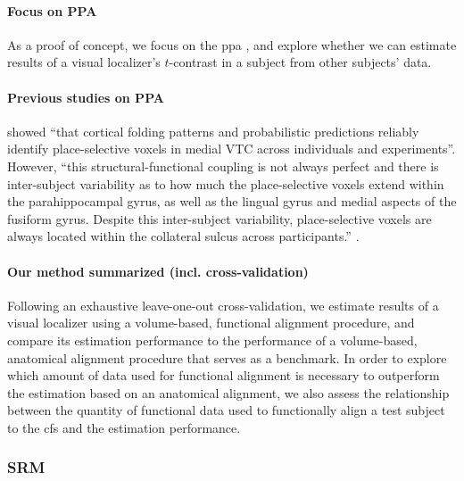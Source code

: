 \paragraph{Focus on PPA}
As a proof of concept, we focus on the \ac{ppa} \citep[e.g.,][for
reviews]{epstein2014neural, aminoff2013role}, and explore whether we can
estimate results of a visual localizer's $t$-contrast in a subject from other
subjects' data.

\paragraph{Previous studies on PPA}


%
\citet{weiner2018defining} showed ``that cortical folding patterns and
probabilistic predictions reliably identify place-selective voxels in medial VTC
across individuals and experiments''.
%
However, ``this structural-functional coupling is not always perfect and there
is inter-subject variability as to how much the place-selective voxels extend
within the parahippocampal gyrus, as well as the lingual gyrus and medial
aspects of the fusiform gyrus.
%
Despite this inter-subject variability, place-selective voxels are always
located within the collateral sulcus across participants.''
\citep{weiner2018defining}.


\paragraph{Our method summarized (incl. cross-validation)}

%
Following an exhaustive leave-one-out cross-validation, we estimate results of a
visual localizer using a volume-based, functional alignment procedure, and
compare its estimation performance to the performance of a volume-based,
anatomical alignment procedure that serves as a benchmark.
In order to explore which amount of data used for functional alignment is
necessary to outperform the estimation based on an anatomical alignment, we also
assess the relationship between the quantity of functional data used to
functionally align a test subject to the \ac{cfs} and the estimation
performance.


\subsubsection{SRM}

